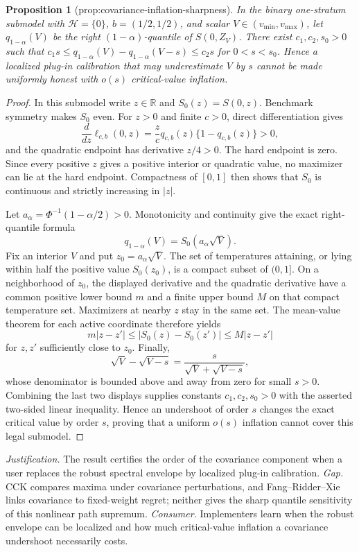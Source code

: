 \documentclass{article}
\newtheorem{proposition}{Proposition}
\begin{document}
\begin{proposition}[prop:covariance-inflation-sharpness]\label{prop:covariance-inflation-sharpness}
In the binary one-stratum submodel with \(\mathcal H=\{0\}\), \(b=(1/2,1/2)\), and scalar \(V\in(v_{\min},v_{\max})\), let \(q_{1-\alpha}(V)\) be the right \((1-\alpha)\)-quantile of \(S(0,Z_V)\). There exist \(c_1,c_2,s_0>0\) such that \(c_1s\le q_{1-\alpha}(V)-q_{1-\alpha}(V-s)\le c_2s\) for \(0<s<s_0\). Hence a localized plug-in calibration that may underestimate \(V\) by \(s\) cannot be made uniformly honest with \(o(s)\) critical-value inflation.
\end{proposition}
\begin{proof}
In this submodel write \(z\in\mathbb R\) and \(S_0(z)=S(0,z)\).  Benchmark symmetry makes \(S_0\) even.  For \(z>0\) and finite \(c>0\), direct differentiation gives
\[
 \frac{d}{dz}\ell_{c,b}(0,z)=\frac{z}{c}q_{c,b}(z)\{1-q_{c,b}(z)\}>0,
\]
and the quadratic endpoint has derivative \(z/4>0\).  The hard endpoint is zero.  Since every positive \(z\) gives a positive interior or quadratic value, no maximizer can lie at the hard endpoint.  Compactness of \([0,1]\) then shows that \(S_0\) is continuous and strictly increasing in \(|z|\).

Let \(a_\alpha=\Phi^{-1}(1-\alpha/2)>0\).  Monotonicity and continuity give the exact right-quantile formula
\[
 q_{1-\alpha}(V)=S_0(a_\alpha\sqrt V).
\]
Fix an interior \(V\) and put \(z_0=a_\alpha\sqrt V\).  The set of temperatures attaining, or lying within half the positive value \(S_0(z_0)\), is a compact subset of \((0,1]\).  On a neighborhood of \(z_0\), the displayed derivative and the quadratic derivative have a common positive lower bound \(m\) and a finite upper bound \(M\) on that compact temperature set.  Maximizers at nearby \(z\) stay in the same set.  The mean-value theorem for each active coordinate therefore yields
\[
 m|z-z'|\le |S_0(z)-S_0(z')|\le M|z-z'|
\]
for \(z,z'\) sufficiently close to \(z_0\).  Finally,
\[
 \sqrt V-\sqrt{V-s}=\frac{s}{\sqrt V+\sqrt{V-s}},
\]
whose denominator is bounded above and away from zero for small \(s>0\).  Combining the last two displays supplies constants \(c_1,c_2,s_0>0\) with the asserted two-sided linear inequality.  Hence an undershoot of order \(s\) changes the exact critical value by order \(s\), proving that a uniform \(o(s)\) inflation cannot cover this legal submodel.
\end{proof}
\par\smallskip\noindent \textit{Justification.} The result certifies the order of the covariance component when a user replaces the robust spectral envelope by localized plug-in calibration. \textit{Gap.} CCK compares maxima under covariance perturbations, and Fang--Ridder--Xie links covariance to fixed-weight regret; neither gives the sharp quantile sensitivity of this nonlinear path supremum. \textit{Consumer.} Implementers learn when the robust envelope can be localized and how much critical-value inflation a covariance undershoot necessarily costs.
\end{document}

